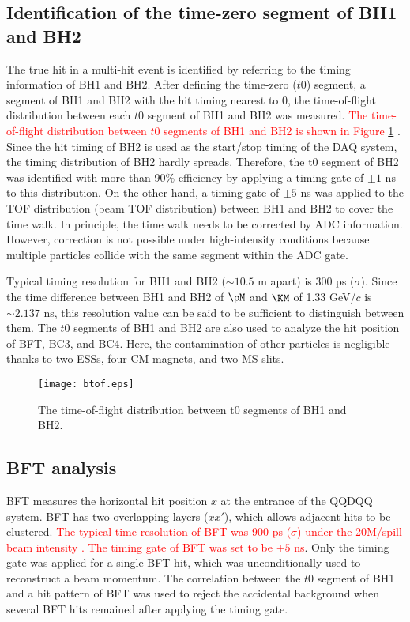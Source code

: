 \subsection{Identification of the time-zero segment of BH1 and BH2}
The true hit in a multi-hit event is identified by referring to the timing information of BH1 and BH2. After defining the time-zero ($t0$) segment, a segment of BH1 and BH2 with the hit timing nearest to 0, the time-of-flight distribution between each $t0$ segment of BH1 and BH2 was measured. \textcolor{red}{ The time-of-flight distribution between $t0$ segments of BH1 and BH2 is shown in Figure \ref{fig-btof} }. Since the hit timing of BH2 is used as the start/stop timing of the DAQ system, the timing distribution of BH2 hardly spreads.
Therefore, the t0 segment of BH2 was identified with more than 90\% efficiency by applying a timing gate of $\pm1$ ns to this distribution. On the other hand, a timing gate of $\pm5$ ns was applied to the TOF distribution (beam TOF distribution) between BH1 and BH2 to cover the time walk. In principle, the time walk needs to be corrected by ADC information. However, correction is not possible under high-intensity conditions because multiple particles collide with the same segment within the ADC gate.

Typical timing resolution for BH1 and BH2 ($\sim10.5$ m apart) is 300 ps ($\sigma$). Since the time difference between BH1 and BH2 of $\pM$ and $\KM$ of 1.33 GeV/$c$ is $\sim2.137$ ns, this resolution value can be said to be sufficient to distinguish between them. The $t0$ segments of BH1 and BH2 are also used to analyze the hit position of BFT, BC3, and BC4. Here, the contamination of other particles is negligible thanks to two ESSs, four CM magnets, and two MS slits. 

\begin{figure}[!h]
  \begin{center}
    \texttt{[image: btof.eps]}
    \caption{The time-of-flight distribution between t0 segments of BH1 and BH2.}
    \label{fig-btof}
  \end{center}
\end{figure}

\subsection{BFT analysis}
BFT measures the horizontal hit position $x$ at the entrance of the QQDQQ system. BFT has two overlapping layers ($xx'$), which allows adjacent hits to be clustered. \textcolor{red}{The typical time resolution of BFT was 900 ps ($\sigma$) under the 20M/spill beam intensity \cite{Nana-D}. The timing gate of BFT was set to be $\pm5$ ns}. Only the timing gate was applied for a single BFT hit, which was unconditionally used to reconstruct a beam momentum. The correlation between the $t0$ segment of BH1 and a hit pattern of BFT was used to reject the accidental background when several BFT hits remained after applying the timing gate.

